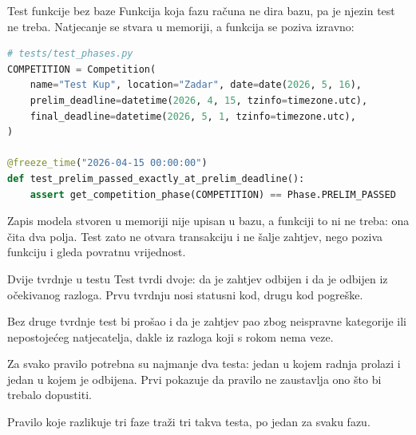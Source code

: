 \begin{frame}[fragile]{Test funkcije bez baze}
Funkcija koja fazu računa ne dira bazu, pa je njezin test ne treba. Natjecanje se stvara u memoriji, a funkcija se poziva izravno:

\begin{lstlisting}[language=python]
# tests/test_phases.py
COMPETITION = Competition(
    name="Test Kup", location="Zadar", date=date(2026, 5, 16),
    prelim_deadline=datetime(2026, 4, 15, tzinfo=timezone.utc),
    final_deadline=datetime(2026, 5, 1, tzinfo=timezone.utc),
)

@freeze_time("2026-04-15 00:00:00")
def test_prelim_passed_exactly_at_prelim_deadline():
    assert get_competition_phase(COMPETITION) == Phase.PRELIM_PASSED
\end{lstlisting}

\vspace{0.2em}
Zapis modela stvoren u memoriji nije upisan u bazu, a funkciji to ni ne treba: ona čita dva polja. Test zato ne otvara transakciju i ne šalje zahtjev, nego poziva funkciju i gleda povratnu vrijednost.
\end{frame}

\begin{frame}{Dvije tvrdnje u testu}
Test tvrdi dvoje: da je zahtjev odbijen i da je odbijen iz očekivanog razloga. Prvu tvrdnju nosi statusni kod, drugu kod pogreške.

\vspace{0.5em}
Bez druge tvrdnje test bi prošao i da je zahtjev pao zbog neispravne kategorije ili nepostojećeg natjecatelja, dakle iz razloga koji s rokom nema veze.

\vspace{0.6em}
Za svako pravilo potrebna su najmanje dva testa: jedan u kojem radnja prolazi i jedan u kojem je odbijena. Prvi pokazuje da pravilo ne zaustavlja ono što bi trebalo dopustiti.

\vspace{0.4em}
Pravilo koje razlikuje tri faze traži tri takva testa, po jedan za svaku fazu.
\end{frame}

